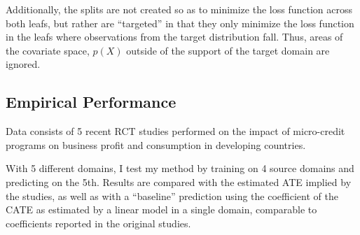 \documentclass[a4paper,12pt]{article}
\begin{document}
Additionally, the splits are not created so as to minimize the loss function across both leafs, but rather are ``targeted'' in that they only minimize the loss function in the leafs where observations from the target distribution fall. Thus, areas of the covariate space, $p(X)$ outside of the support of the target domain are ignored. 

\subsection*{Empirical Performance}

Data consists of 5 recent RCT studies performed on the impact of micro-credit programs on business profit and consumption in developing countries. 

With 5 different domains, I test my method by training on 4 source domains and predicting on the 5th. Results are compared with the estimated ATE implied by the studies, as well as with a ``baseline'' prediction using the coefficient of the CATE as estimated by a linear model in a single domain, comparable to coefficients reported in the original studies. 







\end{document}
